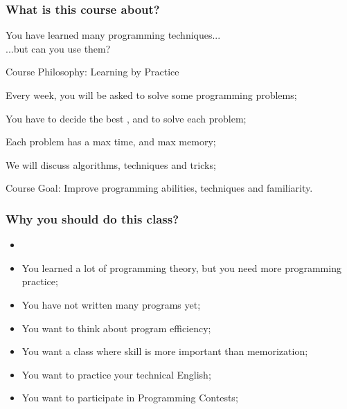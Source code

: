 \documentclass{beamer}
\begin{document}
\begin{frame}
  \frametitle{What is this course about?}
  
  You have learned many programming techniques...\\\hfill ...but can you use them?

  \begin{block}{Course Philosophy: Learning by Practice}
    \begin{itemize}
      {\small
    \item Every week, you will be asked to solve some programming
      problems;
    \item You have to decide the best , and
       to solve each problem;
    \item Each problem has a \alert{max time}, and \alert{max memory};
    \item We will discuss algorithms, techniques and tricks;
      }
    \end{itemize}
  \end{block}

  \begin{exampleblock}{Course Goal:}
    Improve programming abilities, techniques and familiarity.
  \end{exampleblock}
\end{frame}

\begin{frame}
  \frametitle{Why you should do this class?}
  \begin{itemize}
  \item {}

    \smallskip
    
  \item You learned a lot of programming theory, but you need more
    programming practice;
    
    \smallskip

  \item You have not written many programs yet;

    \smallskip

  \item You want to think about program efficiency;

    \smallskip

  \item You want a class where skill is more important than memorization;

    \smallskip

  \item You want to practice your technical English;

    \smallskip

  \item You want to participate in Programming Contests;
  \end{itemize}
\end{frame}
\end{document}
